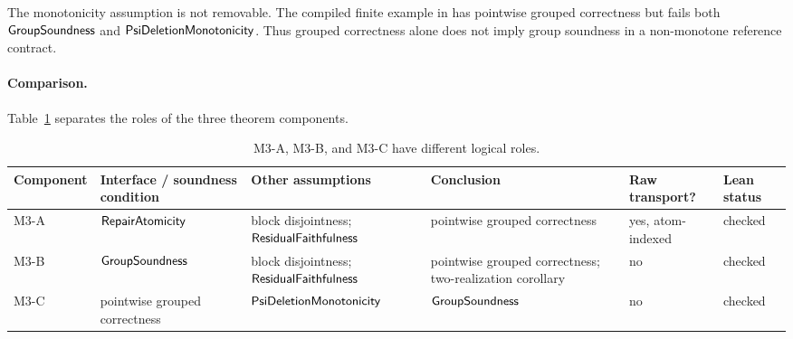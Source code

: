 The monotonicity assumption is not removable.  The compiled finite example in
 has pointwise grouped correctness but fails both
\(\mathsf{GroupSoundness}\) and \(\mathsf{PsiDeletionMonotonicity}\).  Thus grouped correctness
alone does not imply group soundness in a non-monotone reference contract.

\FloatBarrier
\paragraph{Comparison.}
Table~\ref{tab:theorem-comparison} separates the roles of the three theorem
components.

\begin{table}[t]
\centering
\scriptsize
\begin{tabularx}{\textwidth}{@{}p{}p{}p{}p{}p{}X@{}}
\toprule
Component & Interface / soundness condition & Other assumptions & Conclusion & Raw transport? & Lean status \\
\midrule
M3-A & \(\mathsf{RepairAtomicity}\) & block disjointness; \(\mathsf{ResidualFaithfulness}\) & pointwise grouped correctness & yes, atom-indexed & checked \\
M3-B & \(\mathsf{GroupSoundness}\) & block disjointness; \(\mathsf{ResidualFaithfulness}\) & pointwise grouped correctness; two-realization corollary & no & checked \\
M3-C & pointwise grouped correctness & \(\mathsf{PsiDeletionMonotonicity}\) & \(\mathsf{GroupSoundness}\) & no & checked \\
\bottomrule
\end{tabularx}
\caption{M3-A, M3-B, and M3-C have different logical roles.}
\label{tab:theorem-comparison}
\end{table}
